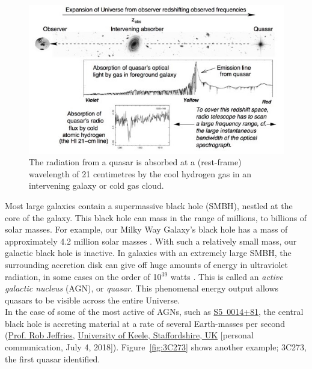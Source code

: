 \documentclass[11pt,a4paper]{report}
\begin{document}
	\begin{figure}[h!]
		\centering
		\includegraphics[scale=1.2]{absorber.jpeg}
		\caption[21 cm radiation is absorbed by the cool gas in an intervening
		object]{{\small The radiation from a quasar is absorbed at a (rest-frame) wavelength of
			21 centimetres by the cool hydrogen gas in an intervening galaxy or cold gas cloud.}}
		\label{fig:absorber}
	\end{figure}
	
	Most large galaxies contain a supermassive black hole (SMBH), nestled at the
	core of the galaxy. This black hole can mass in the range of millions, to
	billions of solar masses. For example, our Milky Way Galaxy's black hole has a
	mass of approximately 4.2 million solar masses \cite{bland}. With such a relatively small mass, our galactic black hole is inactive.
	In galaxies with an extremely large SMBH, the surrounding accretion disk can give off huge amounts of energy in ultraviolet radiation, in some cases on the order of
	10$^{39}$ watts \cite{2013ApJ...762...49B}. This is called an \textit{active galactic nucleus} (AGN), or
	\textit{quasar}. This phenomenal energy output allows quasars to be visible across the entire Universe.\\
	
	In the case of some of the most active of AGNs, such as
	\href{https://en.wikipedia.org/wiki/S5_0014\%2B81}{S5~0014+81}, the central
	black hole is accreting material at a rate of several Earth-masses per second
	(\href{http://www.astro.keele.ac.uk/~rdj/}{Prof. Rob Jeffries},
	\href{https://www.keele.ac.uk/}{University of Keele, Staffordshire, UK}
	[personal communication, July 4, 2018]). Figure~\ref{fig:3C273} shows another example; 3C273, the first quasar identified. 
	\\
	
\end{document}
